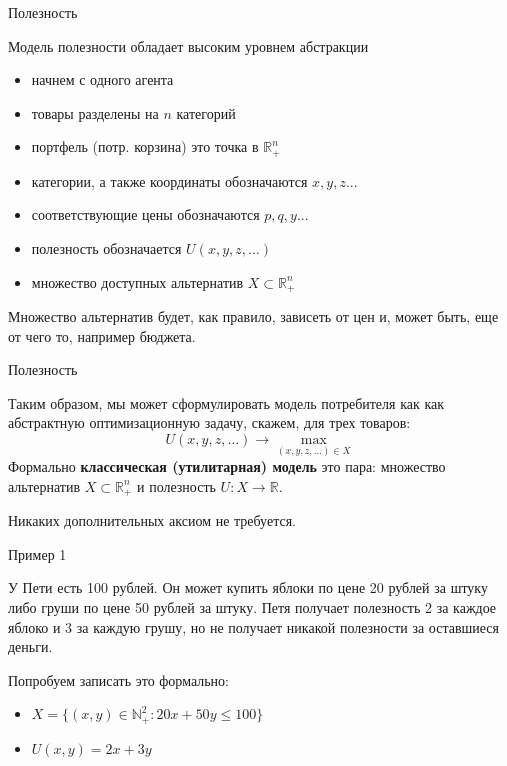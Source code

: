 \documentclass{beamer}
\begin{document}
\begin{frame}{Полезность}

Модель полезности обладает высоким уровнем абстракции

\begin{itemize}
\item начнем с одного агента
\item товары разделены на $n$ категорий
\item портфель (потр. корзина) это точка в $\mathbb{R}_{+}^{n}$	
\item категории, а также координаты обозначаются $x, y, z...$
\item соответствующие цены обозначаются $p, q, y...$
\item полезность обозначается $U(x,y,z, \ldots)$
\item множество доступных альтернатив $X \subset \mathbb{R}_{+}^{n}$
\end{itemize}

Множество альтернатив будет, как правило, зависеть от цен и, может быть, еще от чего то, например бюджета.


\end{frame}

\begin{frame}{Полезность}

Таким образом, мы может сформулировать модель потребителя как как абстрактную оптимизационную задачу, скажем, для трех товаров:
$$ U(x,y,z, \ldots) \to \max_{(x,y,z, \ldots) \in X}$$
Формально \textbf{классическая  (утилитарная) модель} это пара: множество альтернатив $X \subset \mathbb{R}^n_{+}$ и полезность $U: X \to \mathbb{R}$.

Никаких дополнительных аксиом не требуется.

\end{frame}

\begin{frame}{Пример 1}

У Пети есть 100 рублей. Он может купить яблоки по цене 20 рублей за штуку либо груши по цене 50 рублей за штуку. Петя получает полезность 2 за каждое яблоко и 3 за каждую грушу, но не получает никакой полезности за оставшиеся деньги. 

Попробуем записать это формально:

\begin{itemize}
  \item $X = \{(x, y) \in  \mathbb{N}^2_{+}: 20 x + 50 y \leqslant 100 \}$
  \item $U(x, y) = 2x + 3y$
\end{itemize}

\end{frame}
\end{document}
